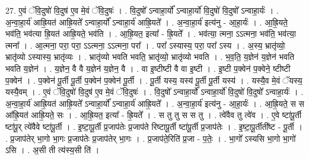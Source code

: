 \documentclass[17pt]{extarticle}
\begin{document}
27. ए॒वं ॅवि॒दुषो॑ वि॒दुष॑ ए॒व मे॒वं ॅवि॒दुषः॑ । . वि॒दुषो᳚ ऽन्वाहा॒र्यो᳚ ऽन्वाहा॒र्यो॑ वि॒दुषो॑ वि॒दुषो᳚ ऽन्वाहा॒र्यः॑ । . अ॒न्वा॒हा॒र्य॑ आह्रि॒यत॑ आह्रि॒यते᳚ ऽन्वाहा॒र्यो᳚ ऽन्वाहा॒र्य॑ आह्रि॒यते᳚ । . अ॒न्वा॒हा॒र्य॑ इत्य॑नु - आ॒हा॒र्यः॑ । . आ॒ह्रि॒यते॒ भव॑ति॒ भव॑त्या ह्रि॒यत॑ आह्रि॒यते॒ भव॑ति । . आ॒ह्रि॒यत॒ इत्या᳚ - ह्रि॒यते᳚ । . भव॑त्या॒ त्मना॒ ऽऽत्मना॒ भव॑ति॒ भव॑त्या॒ त्मना᳚ । . आ॒त्मना॒ परा॒ परा॒ ऽऽत्मना॒ ऽऽत्मना॒ परा᳚ । . परा᳚ ऽस्यास्य॒ परा॒ परा᳚ ऽस्य । . अ॒स्य॒ भ्रातृ॑व्यो॒ भ्रातृ॑व्यो ऽस्यास्य॒ भ्रातृ॑व्यः । . भ्रातृ॑व्यो भवति भवति॒ भ्रातृ॑व्यो॒ भ्रातृ॑व्यो भवति । . भ॒व॒ति॒ य॒ज्ञेन॑ य॒ज्ञेन॑ भवति भवति य॒ज्ञेन॑ । . य॒ज्ञेन॒ वै वै य॒ज्ञेन॑ य॒ज्ञेन॒ वै । . वा इ॒ष्टीष्टी वै वा इ॒ष्टी । . इ॒ष्टी प॒क्वेन॑ प॒क्वेने॒ ष्टीष्टी प॒क्वेन॑ । . प॒क्वेन॑ पू॒र्ती पू॒र्ती प॒क्वेन॑ प॒क्वेन॑ पू॒र्ती । . पू॒र्ती यस्य॒ यस्य॑ पू॒र्ती पू॒र्ती यस्य॑ । . यस्यै॒व मे॒वं ॅयस्य॒ यस्यै॒वम् । . ए॒वं ॅवि॒दुषो॑ वि॒दुष॑ ए॒व मे॒वं ॅवि॒दुषः॑ । . वि॒दुषो᳚ ऽन्वाहा॒र्यो᳚ ऽन्वाहा॒र्यो॑ वि॒दुषो॑ वि॒दुषो᳚ ऽन्वाहा॒र्यः॑ । . अ॒न्वा॒हा॒र्य॑ आह्रि॒यत॑ आह्रि॒यते᳚ ऽन्वाहा॒र्यो᳚ ऽन्वाहा॒र्य॑ आह्रि॒यते᳚ । . अ॒न्वा॒हा॒र्य॑ इत्य॑नु - आ॒हा॒र्यः॑ । . आ॒ह्रि॒यते॒ स स आ᳚ह्रि॒यत॑ आह्रि॒यते॒ सः । . आ॒ह्रि॒यत॒ इत्या᳚ - ह्रि॒यते᳚ । . स तु तु स स तु । . त्वे॑वैव तु त्वे॑व । . ए॒वे ष्टा॑पू॒र्ती ष्टा॑पू॒र् त्ये॑वैवे ष्टा॑पू॒र्ती । . इ॒ष्टा॒पू॒र्ती प्र॒जाप॑तेः प्र॒जाप॑ते रिष्टापू॒र्ती ष्टा॑पू॒र्ती प्र॒जाप॑तेः । . इ॒ष्टा॒पू॒र्तीती᳚ष्ट - पू॒र्ती । . प्र॒जाप॑तेर् भा॒गो भा॒गः प्र॒जाप॑तेः प्र॒जाप॑तेर् भा॒गः । . प्र॒जाप॑ते॒रिति॑ प्र॒जा - प॒तेः॒ । . भा॒गो᳚ ऽस्यसि भा॒गो भा॒गो॑ ऽसि । . अ॒सी ती त्य॑स्य॒सी ति॑ । \newline
\end{document}
